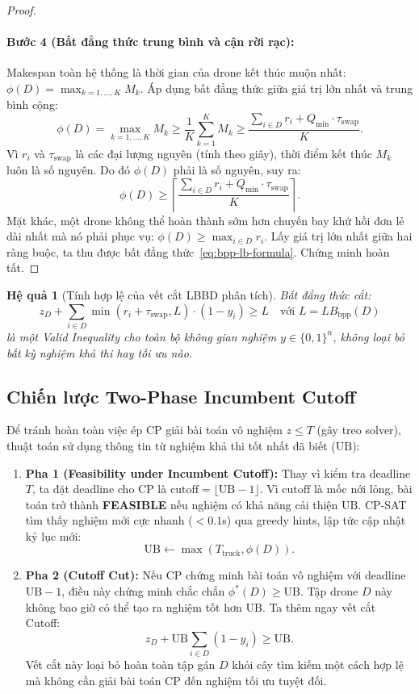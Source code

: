 \documentclass[12pt,a4paper]{article}
\newtheorem{corollary}{Hệ quả}
\newcommand{\UB}{\mathrm{UB}}
\newcommand{\swap}{\tau_{\mathrm{swap}}}
\begin{document}
\begin{proof}
\paragraph{Bước 4 (Bất đẳng thức trung bình và cận rời rạc):}
Makespan toàn hệ thống là thời gian của drone kết thúc muộn nhất: $\phi(D) = \max_{k=1,\dots,K} M_k$. Áp dụng bất đẳng thức giữa giá trị lớn nhất và trung bình cộng:
\[
    \phi(D) = \max_{k=1,\dots,K} M_k \ge \frac{1}{K} \sum_{k=1}^K M_k \ge \frac{\sum_{i \in D} r_i + Q_{\min} \cdot \swap}{K}.
\]
Vì $r_i$ và $\swap$ là các đại lượng nguyên (tính theo giây), thời điểm kết thúc $M_k$ luôn là số nguyên. Do đó $\phi(D)$ phải là số nguyên, suy ra:
\[
    \phi(D) \ge \left\lceil \frac{\sum_{i \in D} r_i + Q_{\min} \cdot \swap}{K} \right\rceil.
\]
Mặt khác, một drone không thể hoàn thành sớm hơn chuyến bay khứ hồi đơn lẻ dài nhất mà nó phải phục vụ: $\phi(D) \ge \max_{i \in D} r_i$. 
Lấy giá trị lớn nhất giữa hai ràng buộc, ta thu được bất đẳng thức~\eqref{eq:bpp-lb-formula}. Chứng minh hoàn tất.
\end{proof}

\begin{corollary}[Tính hợp lệ của vết cắt LBBD phân tích]
Bất đẳng thức cắt:
\begin{equation}
    z_D + \sum_{i \in D} \min(r_i + \swap, L) \cdot (1 - y_i) \ge L \quad \text{với } L = LB_{\mathrm{bpp}}(D)
\end{equation}
là một Valid Inequality cho toàn bộ không gian nghiệm $y \in \{0, 1\}^n$, không loại bỏ bất kỳ nghiệm khả thi hay tối ưu nào.
\end{corollary}

\subsection{Chiến lược Two-Phase Incumbent Cutoff}
Để tránh hoàn toàn việc ép CP giải bài toán vô nghiệm $z \le T$ (gây treo solver), thuật toán sử dụng thông tin từ nghiệm khả thi tốt nhất đã biết ($\UB$):
\begin{enumerate}[leftmargin=2em]
    \item \textbf{Pha 1 (Feasibility under Incumbent Cutoff):} Thay vì kiểm tra deadline $T$, ta đặt deadline cho CP là $\mathrm{cutoff} = \lfloor \UB - 1 \rfloor$. Vì $\mathrm{cutoff}$ là mốc nới lỏng, bài toán trở thành \textbf{FEASIBLE} nếu nghiệm có khả năng cải thiện $\UB$. CP-SAT tìm thấy nghiệm mới cực nhanh ($< 0.1$s) qua greedy hints, lập tức cập nhật kỷ lục mới:
    \[
        \UB \leftarrow \max(T_{\mathrm{truck}}, \phi(D)).
    \]
    \item \textbf{Pha 2 (Cutoff Cut):} Nếu CP chứng minh bài toán vô nghiệm với deadline $\UB - 1$, điều này chứng minh chắc chắn $\phi^*(D) \ge \UB$. Tập drone $D$ này không bao giờ có thể tạo ra nghiệm tốt hơn $\UB$. Ta thêm ngay vết cắt Cutoff:
    \begin{equation}
        z_D + \UB \sum_{i \in D} (1 - y_i) \ge \UB.
    \end{equation}
    Vết cắt này loại bỏ hoàn toàn tập gán $D$ khỏi cây tìm kiếm một cách hợp lệ mà không cần giải bài toán CP đến nghiệm tối ưu tuyệt đối.
\end{enumerate}
\end{document}
